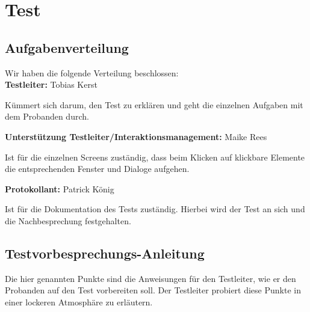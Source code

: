 \chapter{Test}
\label{chap:test}

\section{Aufgabenverteilung}

Wir haben die folgende Verteilung beschlossen:\\

\textbf{Testleiter:} Tobias Kerst

Kümmert sich darum, den Test zu erklären und geht die einzelnen Aufgaben mit dem Probanden durch.

\textbf{Unterstützung Testleiter/Interaktionsmanagement:} Maike Rees

Ist für die einzelnen Screens zuständig, dass beim Klicken auf klickbare Elemente die entsprechenden Fenster und Dialoge aufgehen.

\textbf{Protokollant:} Patrick König

Ist für die Dokumentation des Tests zuständig. Hierbei wird der Test an sich und die Nachbesprechung festgehalten.

\section{Testvorbesprechungs-Anleitung}
\label{sec:testvorbesprechung}

Die hier genannten Punkte sind die Anweisungen für den Testleiter, wie er den Probanden auf den Test vorbereiten soll. Der Testleiter probiert diese Punkte in einer lockeren Atmosphäre zu erläutern.

